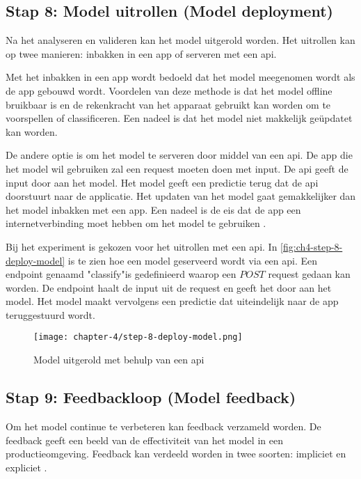 \subsection{Stap 8: Model uitrollen (Model deployment)}\label{subsec:ch4-model-uitrollen}
Na het analyseren en valideren kan het model uitgerold worden. Het uitrollen kan op twee manieren: inbakken in een app of serveren met een \acrfull{api}.

Met het inbakken in een app wordt bedoeld dat het model meegenomen wordt als de app gebouwd wordt. Voordelen van deze methode is dat het model offline bruikbaar is en de rekenkracht van het apparaat gebruikt kan worden om te voorspellen of classificeren. Een nadeel is dat het model niet makkelijk geüpdatet kan worden.

De andere optie is om het model te serveren door middel van een \Acrshort{api}. De app die het model wil gebruiken zal een request moeten doen met input. De \Acrshort{api} geeft de input door aan het model. Het model geeft een predictie terug dat de \Acrshort{api} doorstuurt naar de applicatie. Het updaten van het model gaat gemakkelijker dan het model inbakken met een app. Een nadeel is de eis dat de app een internetverbinding moet hebben om het model te gebruiken \cite[p.~130]{introduction-to-machine-learning}.

Bij het experiment is gekozen voor het uitrollen met een \acrshort{api}. In \autoref{fig:ch4-step-8-deploy-model} is te zien hoe een model geserveerd wordt via een \Acrshort{api}. Een endpoint genaamd "classify"\space is gedefinieerd waarop een \(POST\) request gedaan kan worden. De endpoint haalt de input uit de request en geeft het door aan het model. Het model maakt vervolgens een predictie dat uiteindelijk naar de app teruggestuurd wordt.

\begin{figure}[hbt!]
  \centering
  \texttt{[image: chapter-4/step-8-deploy-model.png]}
  \caption{Model uitgerold met behulp van een \Acrshort{api}}
  \label{fig:ch4-step-8-deploy-model}
\end{figure}

\newpage

\subsection{Stap 9: Feedbackloop (Model feedback)}\label{subsec:ch4-feebdack-loop}
Om het model continue te verbeteren kan feedback verzameld worden. De feedback geeft een beeld van de effectiviteit van het model in een productieomgeving. Feedback kan verdeeld worden in twee soorten: impliciet en expliciet \cite[p.~264]{introduction-to-machine-learning}.

